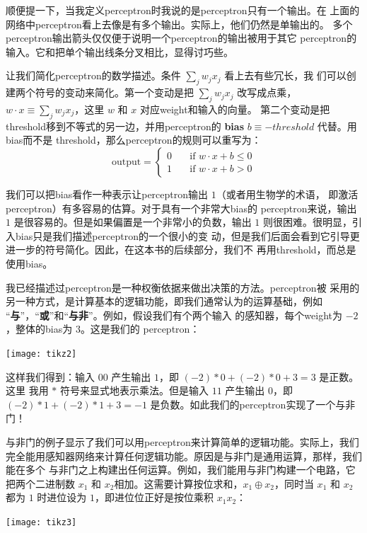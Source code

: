 顺便提一下，当我定义\gls*{perceptron}时我说的是\gls*{perceptron}只有一个输出。在
上面的网络中\gls*{perceptron}看上去像是有多个输出。实际上，他们仍然是单输出的。
多个\gls*{perceptron}输出箭头仅仅便于说明一个\gls*{perceptron}的输出被用于其它%
\gls*{perceptron}的输入。它和把单个输出线条分叉相比，显得讨巧些。

让我们简化\gls*{perceptron}的数学描述。条件 $\sum_j w_j x_j$ 看上去有些冗长，我
们可以创建两个符号的变动来简化。第一个变动是把 $\sum_j w_j x_j$ 改写成点乘，$w
\cdot x \equiv \sum_j w_j x_j$，这里 $w$ 和 $x$ 对应\gls*{weight}和输入的向量。
第二个变动是把\gls*{threshold}移到不等式的另一边，并用\gls*{perceptron}的%
\textbf{\gls{bias}} $b \equiv -threshold$ 代替。用\gls*{bias}而不是%
\gls*{threshold}，那么\gls*{perceptron}的规则可以重写为：
\begin{equation}
  \text{output} = \begin{cases}
    0 & \quad \text{if } w\cdot x + b \leq 0 \\
    1 & \quad \text{if } w\cdot x + b > 0
  \end{cases}
  \tag{2}
\end{equation}

我们可以把\gls*{bias}看作一种表示让\gls*{perceptron}输出 $1$（或者用生物学的术语，
  即激活\gls*{perceptron}）有多容易的估算。对于具有一个非常大\gls*{bias}的%
\gls*{perceptron}来说，输出 $1$ 是很容易的。但是如果偏置是一个非常小的负数，输出
$1$ 则很困难。很明显，引入\gls*{bias}只是我们描述\gls*{perceptron}的一个很小的变
动，但是我们后面会看到它引导更进一步的符号简化。因此，在这本书的后续部分，我们不
再用\gls*{threshold}，而总是使用\gls*{bias}。

我已经描述过\gls*{perceptron}是一种权衡依据来做出决策的方法。\gls*{perceptron}被
采用的另一种方式，是计算基本的逻辑功能，即我们通常认为的运算基础，例如
“\textbf{与}”，“\textbf{或}”和“\textbf{与非}”。例如，假设我们有个两个输入
的感知器，每个\gls*{weight}为 $-2$，整体的\gls*{bias}为 $3$。这是我们的
\gls*{perceptron}：
\begin{center}
  \texttt{[image: tikz2]}
\end{center}

这样我们得到：输入 $00$ 产生输出 $1$，即 $(-2)*0 + (-2)*0 + 3 = 3$ 是正数。这里
我用 $*$ 符号来显式地表示乘法。但是输入 $11$ 产生输出 $0$，即 $(-2)*1 + (-2)*1 +
3 = -1$ 是负数。如此我们的\gls*{perceptron}实现了一个与非门！

与非门的例子显示了我们可以用\gls*{perceptron}来计算简单的逻辑功能。实际上，我们
完全能用感知器网络来计算任何逻辑功能。原因是与非门是通用运算，那样，我们能在多个
与非门之上构建出任何运算。例如，我们能用与非门构建一个电路，它把两个二进制数
$x_1$ 和 $x_2$相加。这需要计算按位求和，$x_1 \oplus x_2$，同时当 $x_1$ 和 $x_2$
都为 $1$ 时进位设为 $1$，即进位位正好是按位乘积 $x_1x_2$：
\begin{center}
  \texttt{[image: tikz3]}
\end{center}

